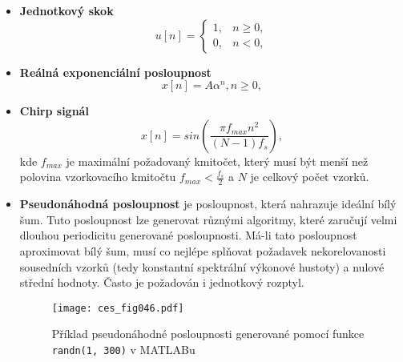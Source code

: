     \begin{itemize}
      \item \textbf{Jednotkový skok}
            \begin{equation}\label{ces:eq002}
              u[n]=
              \begin{cases} 
                 1, &  n \geq 0, \\
                 0, &  n < 0,
              \end{cases}
            \end{equation}
      \item \textbf{Reálná exponenciální posloupnost}
            \begin{equation}\label{SAS:eq_exp}
              x[n] = A\alpha^n, n\geq0,
            \end{equation}
      \item \textbf{Chirp signál}
            \begin{equation}\label{SAS:eq_chirp}
              x[n] = sin\left(\frac{\pi f_{max}n^2}{(N-1)f_s}\right),
            \end{equation}
            kde $f_{max}$ je maximální požadovaný kmitočet, který musí být menší než polovina
            vzorkovacího kmitočtu $f_{max}<\frac{f_s}{2}$ a $N$ je celkový počet vzorků.
      \item \textbf{Pseudonáhodná posloupnost} je posloupnost, která nahrazuje ideální bílý šum.
            Tuto posloupnost lze generovat různými algoritmy, které zaručují velmi dlouhou
            periodicitu generované posloupnosti. Má-li tato posloupnost aproximovat bílý šum, musí
            co nejlépe splňovat požadavek nekorelovanosti sousedních vzorků (tedy konstantní
            spektrální výkonové hustoty) a nulové střední hodnoty. Často je požadován i jednotkový
            rozptyl.
            \begin{figure}[ht!]
             \centering
             \texttt{[image: ces\_fig046.pdf]}
             \caption[Příklad pseudonáhodné posloupnosti]{Příklad pseudonáhodné posloupnosti
                      generované pomocí funkce \texttt{randn(1, 300)} v MATLABu}
             \label{ces:fig046}
         \end{figure}
    \end{itemize}
    
